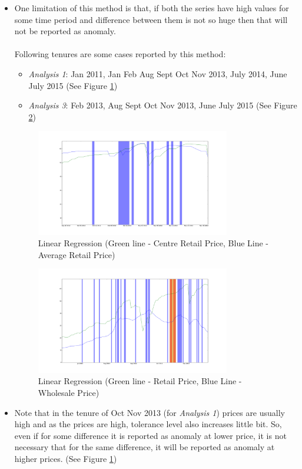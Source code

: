 \documentclass[a4paper,10pt]{report}
\begin{document}
\begin{itemize}
			\item One limitation of this method is that, if both the series have high values for some time period and difference between them is not so huge then that will not be reported as anomaly.	\\
			\\
			Following tenures are some cases reported by this method:
			\begin{itemize}
				\item \textit{Analysis 1}: Jan 2011, Jan Feb Aug Sept Oct Nov 2013, July 2014, June July 2015 (See Figure \ref{fig:12212})
				\item \textit{Analysis 3}: Feb 2013, Aug Sept Oct Nov 2013, June July 2015 (See Figure \ref{fig:12232})
			\end{itemize}
			\begin{figure}[H]
		    	\centering
  		    	\includegraphics[width=0.8\textwidth]{graphs/12212.png}
		    	\caption{Linear Regression (Green line - Centre Retail Price, Blue Line - Average Retail Price)}
		    	\label{fig:12212}
			\end{figure}
			
			\begin{figure}[H]
		    	\centering
  		    	\includegraphics[width=0.8\textwidth]{graphs/12232.png}
		    	\caption{Linear Regression (Green line - Retail Price, Blue Line - Wholesale Price)}
		    	\label{fig:12232}
			\end{figure}
			
					
			
			\item  Note that in the tenure of Oct Nov 2013 (for \textit{Analysis 1}) prices are usually high and as the prices are high, tolerance level also increases little bit. So, even if for some difference it is reported as anomaly at lower price, it is not necessary that for the same difference, it will be reported as anomaly at higher prices. (See Figure \ref{fig:12212})		
			
		\end{itemize}
		
\end{document}
